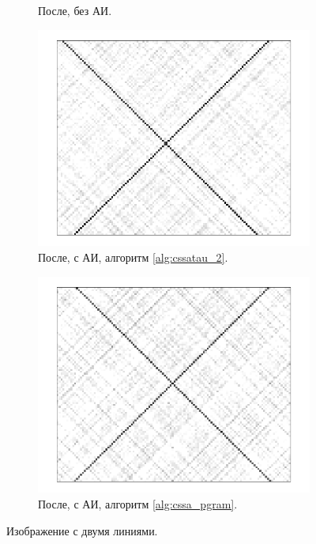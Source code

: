 \documentclass[specialist,
               substylefile = spbu.rtx,
               subf,href,colorlinks=true, 12pt]{disser}
\begin{document}
\begin{figure}
\begin{subfigure}[b]{0.45\textwidth}
        \caption{После, без АИ.}
        \label{fig:a_many_after}
    \end{subfigure}
    \begin{subfigure}[b]{0.45\textwidth}
        \includegraphics[width=\textwidth]{auto_lines}
        \caption{После, с АИ, алгоритм \ref{alg:cssatau_2}.}
        \label{fig:a_many_after2}
    \end{subfigure}
        \quad
        \begin{subfigure}[b]{0.45\textwidth}
       \includegraphics[width=\textwidth]{auto_lines_freq}
        \caption{После, с АИ, алгоритм \ref{alg:cssa_pgram}.}
        \label{fig:a_many_after3}
    \end{subfigure}
       \caption{Изображение с двумя линиями.}\label{fig:a_many}
\end{figure}
\end{document}
